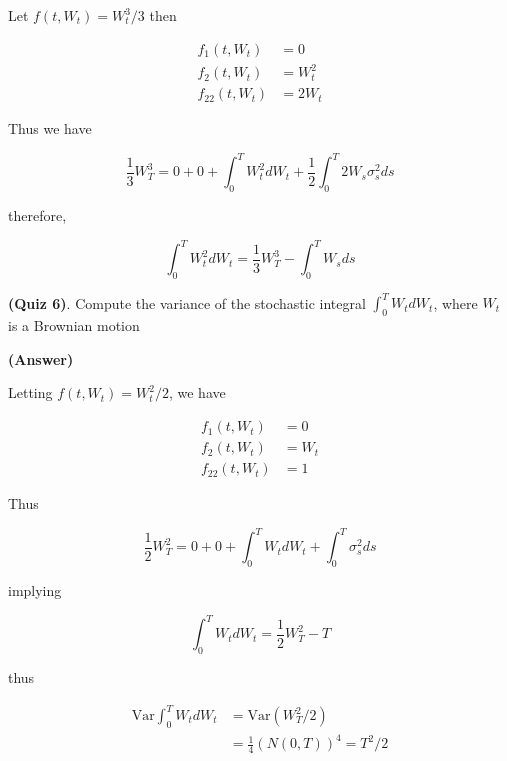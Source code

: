 \documentclass[12pt]{article}
\theoremstyle{nonumberbreak}
\begin{document}
Let $f(t,W_t) = W_t^3 /3$ then

$$
\begin{aligned}
f_1(t,W_t) &= 0 \\[8pt]
f_2(t,W_t) &= W_t^2 \\[8pt]
f_{22}(t,W_t) &= 2W_t
\end{aligned}
$$

Thus we have

$$
\frac{1}{3} W_T^3 = 0 + 0 + \int_0^T W_t^2 dW_t + \frac{1}{2} \int_0^T 2W_s \sigma_s^2 ds
$$

therefore,

$$
\int_0^T W_t^2 dW_t = \frac{1}{3} W_T^3 - \int_0^T W_s ds
$$


\textbf{(Quiz 6)}. Compute the variance of the stochastic integral $\int_0^TW_t dW_t$, where $W_t$ is a Brownian motion

\textbf{(Answer)} 

Letting $f(t,W_t) = W_t^2/2$, we have

$$
\begin{aligned}
f_1(t,W_t) &= 0 \\[8pt]
f_2(t,W_t) &= W_t \\[8pt]
f_{22}(t,W_t) &= 1
\end{aligned}
$$

Thus

$$
\frac{1}{2} W_T^2 = 0 + 0 + \int_0^T W_t dW_t + \int_0^T \sigma_s^2 ds
$$

implying

$$
\int_0^T W_t dW_t = \frac{1}{2} W_T^2 - T
$$

thus

$$
 \begin{aligned}
 \mathrm{Var} \int_0^T W_t dW_t &= \mathrm{Var} \left( W_T^2/2\right) \\[8pt]
 &= \frac{1}{4} \left(N(0,T)\right)^4 = T^2/2
 \end{aligned}
 $$ 
\end{document}
